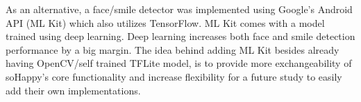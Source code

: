 As an alternative, a face/smile detector was implemented using Google's Android API (ML Kit) \cite{mlkit} which also utilizes TensorFlow.
ML Kit comes with a model trained using deep learning.
Deep learning increases both face and smile detection performance by a big margin.
The idea behind adding ML Kit besides already having OpenCV/self trained TFLite model, is to provide more exchangeability of soHappy's core functionality and increase flexibility for a future study to easily add their own implementations.
